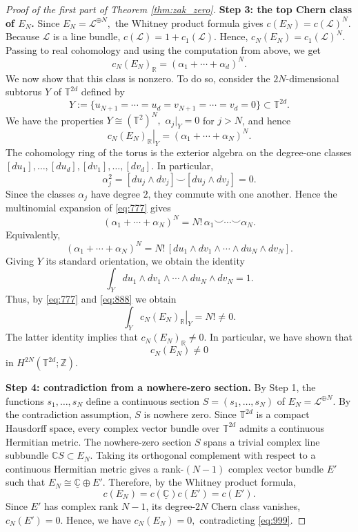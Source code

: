 \documentclass[10pt,a4paper]{amsart}
\def\T{{\mathbb T}}
\begin{document}
\begin{proof}[Proof of the first part of Theorem \ref{thm:zak_zero}]
\smallskip
\noindent\textbf{Step 3: the top Chern class of $E_N$.}
Since
$
E_N=\mathcal L^{\oplus N},
$
the Whitney product formula gives
$
c(E_N)=c(\mathcal L)^N.
$
Because $\mathcal L$ is a line bundle,
$
c(\mathcal L)=1+c_1(\mathcal L).
$
Hence,
$
c_N(E_N)=c_1(\mathcal L)^N.
$
Passing to real cohomology and using the computation from above, we get
$$
c_N(E_N)_{\mathbb R}
=
(\alpha_1+\cdots+\alpha_d)^N.
$$
We now show that this class is nonzero. To do so, consider the $2N$-dimensional subtorus $Y$ of $\T^{2d}$ defined by
$$
Y
:=
\{u_{N+1}=\cdots=u_d=v_{N+1}=\cdots=v_d=0\}
\subset \mathbb T^{2d}.
$$
We have the properties
$
Y\cong(\mathbb T^2)^N,
$
$
\alpha_j|_Y=0
$
for $j > N$, and hence
\begin{equation}\label{eq:777}
    \left.c_N(E_N)_{\mathbb R}\right|_Y
=
(\alpha_1+\cdots+\alpha_N)^N.
\end{equation}
The cohomology ring of the torus is the exterior algebra on the degree-one classes
$[du_1],\dots,[du_d],[dv_1],\dots,[dv_d]$. In particular,
$$
\alpha_j^2
=
[du_j\wedge dv_j]\smile[du_j\wedge dv_j]
=
0.
$$
Since the classes $\alpha_j$ have degree $2$, they commute with one another. Hence
the multinomial expansion of \eqref{eq:777} gives
\begin{equation}\label{eq:888}
    (\alpha_1+\cdots+\alpha_N)^N
=
N!\,\alpha_1\smile\cdots\smile\alpha_N.
\end{equation}
Equivalently,
$$
(\alpha_1+\cdots+\alpha_N)^N
=
N!\,[du_1\wedge dv_1\wedge\cdots\wedge du_N\wedge dv_N].
$$
Giving $Y$ its standard orientation, we obtain the identity
$$
\int_Y
du_1\wedge dv_1\wedge\cdots\wedge du_N\wedge dv_N
=
1.
$$
Thus, by \eqref{eq:777} and \eqref{eq:888} we obtain
$$
\int_Y
\left.c_N(E_N)_{\mathbb R}\right|_Y
=
N!\neq 0.
$$
The latter identity implies that
$
c_N(E_N)_{\mathbb R}\neq 0.
$
In particular, we have shown that
\begin{equation}\label{eq:999}
    c_N(E_N)\neq 0
\end{equation}
in $H^{2N}(\mathbb T^{2d};\mathbb Z)$.

\smallskip
\noindent\textbf{Step 4: contradiction from a nowhere-zero section.}
By Step 1, the functions $s_1,\dots,s_N$ define a continuous section
$
S=(s_1,\dots,s_N)
$
of
$
E_N=\mathcal L^{\oplus N}.
$
By the contradiction assumption, $S$ is nowhere zero.
Since $\mathbb T^{2d}$ is a compact Hausdorff space, every complex vector bundle over
$\mathbb T^{2d}$ admits a continuous Hermitian metric. The nowhere-zero section $S$
spans a trivial complex line subbundle
$
\mathbb C S\subset E_N.
$
Taking its orthogonal complement with respect to a continuous Hermitian metric gives
a rank-$(N-1)$ complex vector bundle $E'$ such that
$
E_N\cong \underline{\mathbb C}\oplus E'.
$
Therefore, by the Whitney product formula,
$$
c(E_N)
=
c(\underline{\mathbb C})c(E')
=
c(E').
$$
Since $E'$ has complex rank $N-1$, its degree-$2N$ Chern class vanishes,
$
c_N(E')=0.
$
Hence, we have
$
c_N(E_N)=0,
$
contradicting \eqref{eq:999}.
\end{proof}
\end{document}
